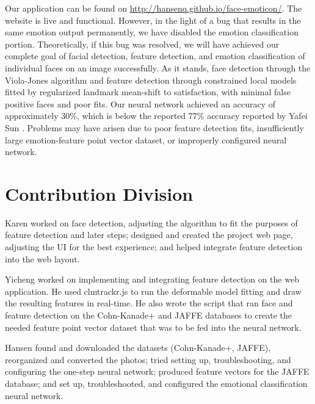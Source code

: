 \documentclass[10pt,twocolumn,letterpaper]{article}
\begin{document}
Our application can be found on \url{http://hansenq.github.io/face-emoticon/}. The website is live and functional. However, in the light of a bug that results in the same emotion output permanently, we have disabled the emotion classification portion. Theoretically, if this bug was resolved, we will have achieved our complete goal of facial detection, feature detection, and emotion classification of individual faces on an image successfully. As it stands, face detection through the Viola-Jones algorithm and feature detection through constrained local models fitted by regularized landmark mean-shift to satisfaction, with minimal false positive faces and poor fits. Our neural network achieved an accuracy of approximately 30\%, which is below the reported 77\% accuracy reported by Yafei Sun \cite{Sun}. Problems may have arisen due to poor feature detection fits, insufficiently large emotion-feature point vector dataset, or improperly configured neural network. 

\section{Contribution Division}

Karen worked on face detection, adjusting the algorithm to fit the purposes of feature detection and later steps; designed and created the project web page, adjusting the UI for the best experience; and helped integrate feature detection into the web layout.

Yicheng worked on implementing and integrating feature detection on the web application. He used clmtrackr.js to run the deformable model fitting and draw the resulting features in real-time. He also wrote the script that ran face and feature detection on the Cohn-Kanade+ and JAFFE databases to create the needed feature point vector dataset that was to be fed into the neural network. 

Hansen found and downloaded the datasets (Cohn-Kanade+, JAFFE), reorganized and converted the photos; tried setting up, troubleshooting, and configuring the one-step neural network; produced feature vectors for the JAFFE database; and set up, troubleshooted, and configured the emotional classification neural network.



\end{document}
